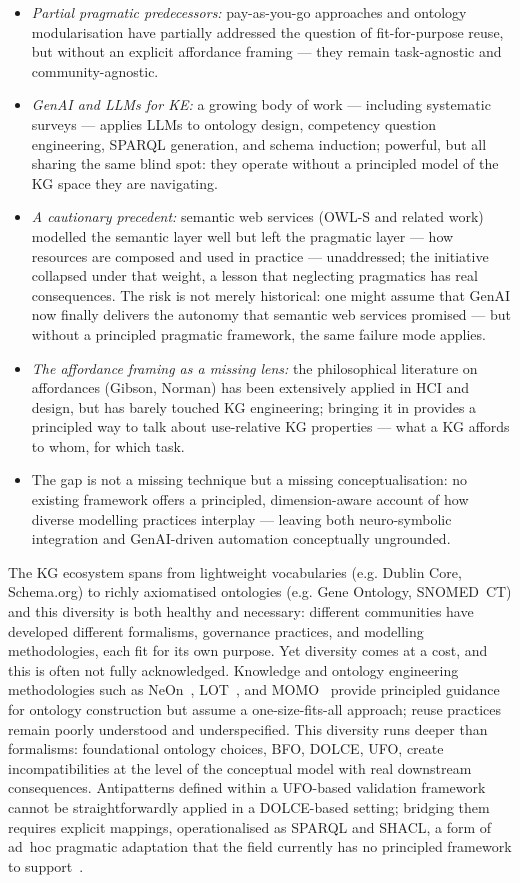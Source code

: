 \documentclass[runningheads]{llncs}
\newcommand{\add}[1]{\textcolor{addedcolor}{#1}}
\begin{document}
\begin{itemize}
	\item \textit{Partial pragmatic predecessors:} pay-as-you-go approaches and ontology modularisation have partially addressed the question of fit-for-purpose reuse, but without an explicit affordance framing --- they remain task-agnostic and community-agnostic. %
    \item \textit{GenAI and LLMs for KE:} a growing body of work --- including systematic surveys --- applies LLMs to ontology design, competency question engineering, SPARQL generation, and schema induction; powerful, but all sharing the same blind spot: they operate without a principled model of the KG space they are navigating. %
    \item \textit{A cautionary precedent:} semantic web services (OWL-S and related work) modelled the semantic layer well but left the pragmatic layer --- how resources are composed and used in practice --- unaddressed; the initiative collapsed under that weight, a lesson that neglecting pragmatics has real consequences. %
    The risk is not merely historical: one might assume that GenAI now finally delivers the autonomy that semantic web services promised — but without a principled pragmatic framework, the same failure mode applies.
    \item \textit{The affordance framing as a missing lens:} the philosophical literature on affordances (Gibson, Norman) has been extensively applied in HCI and design, but has barely touched KG engineering; bringing it in provides a principled way to talk about use-relative KG properties --- what a KG affords to whom, for which task. %
    \item The gap is not a missing technique but a missing conceptualisation: no existing framework offers a principled, dimension-aware account of how diverse modelling practices interplay --- leaving both neuro-symbolic integration and GenAI-driven automation conceptually ungrounded. %
\end{itemize}
\add{
The KG ecosystem spans from lightweight vocabularies (e.g. Dublin Core,
Schema.org) to richly axiomatised ontologies (e.g. Gene Ontology,
SNOMED~CT) and this diversity is both healthy and necessary: different
communities have developed different formalisms, governance practices,
and modelling methodologies, each fit for its own purpose. Yet diversity
comes at a cost, and this is often not fully acknowledged. Knowledge and ontology engineering methodologies such
as NeOn~\cite{suarez2011neon}, LOT~\cite{poveda2022lot}, and MOMO~\cite{shimizu2023modular} provide
principled guidance for ontology construction but assume a
one-size-fits-all approach; reuse practices remain poorly understood
and underspecified. This diversity runs deeper than formalisms:
foundational ontology choices, BFO, DOLCE, UFO, create
incompatibilities at the level of the conceptual model with real
downstream consequences. Antipatterns defined within a UFO-based
validation framework cannot be straightforwardly applied in a
DOLCE-based setting; bridging them requires explicit mappings,
operationalised as SPARQL and SHACL, a form of
ad~hoc pragmatic adaptation that the field currently has no principled
framework to support~\cite{guizzardi2021,morlidge2026animlontology}.}
\end{document}
